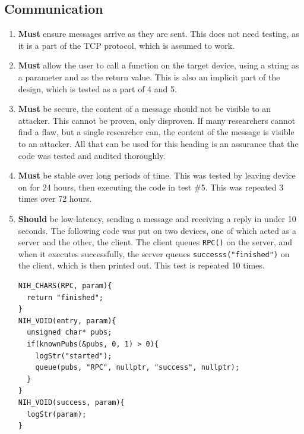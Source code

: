 \documentclass{article}
\begin{document}
\subsection{Communication}
\begin{enumerate}
\item \textbf{Must} ensure messages arrive as they are sent. This does not need testing, as it is a part of the TCP protocol, which is assumed to work.
\item \textbf{Must} allow the user to call a function on the target device, using a
string as a parameter and as the return value. This is also an implicit part of the design, which is tested as a part of 4 and 5.
\item \textbf{Must} be secure, the content of a message should not be visible to
an attacker. This cannot be proven, only disproven. If many researchers cannot find a flaw, but a single researcher can, the content of the message is visible to an attacker. All that can be used for this heading is an assurance that the code was tested and audited thoroughly.
\item \textbf{Must} be stable over long periods of time. This was tested by leaving device on for 24 hours, then executing the code in test \#5. This was repeated 3 times over 72 hours.
\item \textbf{Should} be low-latency, sending a message and receiving a reply in under 10 seconds. The following code was put on two devices, one of which acted as a server and the other, the client. The client queues \texttt{RPC()} on the server, and when it executes successfully, the server queues \texttt{successs("finished")} on the client, which is then printed out. This test is repeated 10 times.

\begin{tcolorbox}[colback=white,grow to left by=2.5mm,grow to right by=2.5mm,left*=0mm,right*=0mm,sharp corners]
\begin{verbatim}
NIH_CHARS(RPC, param){
  return "finished";
}
NIH_VOID(entry, param){
  unsigned char* pubs;
  if(knownPubs(&pubs, 0, 1) > 0){
    logStr("started");
    queue(pubs, "RPC", nullptr, "success", nullptr);
  }
}
NIH_VOID(success, param){
  logStr(param);
}
\end{verbatim}
\end{tcolorbox}


\end{enumerate}
\end{document}
